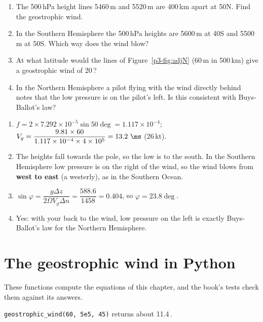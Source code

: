 \begin{tryit}
\begin{enumerate}[label=\textbf{\thechapter.\arabic*},leftmargin=*,itemsep=3pt]
\item The 500\,hPa height lines 5460\,m and 5520\,m are 400\,km apart at 50\deg N. Find the geostrophic wind.
\item In the Southern Hemisphere the 500\,hPa heights are 5600\,m at 40\deg S and 5500\,m at 50\deg S. Which way does the wind blow?
\item At what latitude would the lines of Figure~\ref{p3-fig:adjN} (60\,m in 500\,km) give a geostrophic wind of 20\,\ms?
\item In the Northern Hemisphere a pilot flying with the wind directly behind notes that the low pressure is on the pilot's left. Is this consistent with Buys-Ballot's law?
\end{enumerate}
\end{tryit}

\begin{answerbox}
\begin{enumerate}[label=\textbf{\thechapter.\arabic*},leftmargin=*,itemsep=3pt]
\item $f=2\times7.292\times10^{-5}\sin50\deg=1.117\times10^{-4}$; $V_g=\dfrac{9.81\times60}{1.117\times10^{-4}\times4\times10^{5}}=13.2\ \ms$ (26\,kt).
\item The heights fall towards the pole, so the low is to the south. In the Southern Hemisphere low pressure is on the right of the wind, so the wind blows from \textbf{west to east} (a westerly), as in the Southern Ocean.
\item $\sin\varphi=\dfrac{g\Delta z}{2\Omega V_g\Delta n}=\dfrac{588.6}{1458}=0.404$, so $\varphi=23.8\deg$.
\item Yes: with your back to the wind, low pressure on the left is exactly Buys-Ballot's law for the Northern Hemisphere.
\end{enumerate}
\end{answerbox}

\section{The geostrophic wind in Python}

These functions compute the equations of this chapter, and the book's tests check them against its answers.




\verb|geostrophic_wind(60, 5e5, 45)| returns about 11.4\,\ms.
